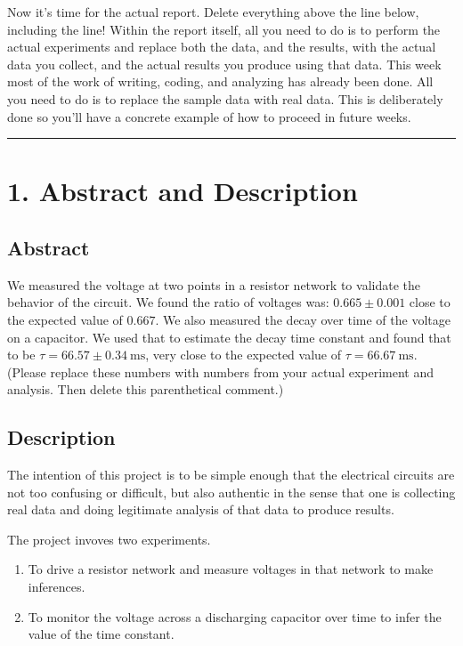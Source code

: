 \documentclass[
  letterpaper,
  DIV=11,
  numbers=noendperiod]{scrartcl}
\providecommand{\tightlist}{%
  \setlength{\itemsep}{0pt}\setlength{\parskip}{0pt}}\usepackage{longtable,booktabs,array}
\begin{document}
Now it's time for the actual report. Delete everything above the line
below, including the line! Within the report itself, all you need to do
is to perform the actual experiments and replace both the data, and the
results, with the actual data you collect, and the actual results you
produce using that data. This week most of the work of writing, coding,
and analyzing has already been done. All you need to do is to replace
the sample data with real data. This is deliberately done so you'll have
a concrete example of how to proceed in future weeks.

\begin{center}\rule{0.5\linewidth}{0.5pt}\end{center}

\section{1. Abstract and Description}\label{abstract-and-description}

\subsection{Abstract}\label{abstract}

We measured the voltage at two points in a resistor network to validate
the behavior of the circuit. We found the ratio of voltages was:
\(0.665\pm 0.001\) close to the expected value of \(0.667\). We also
measured the decay over time of the voltage on a capacitor. We used that
to estimate the decay time constant and found that to be
\(\tau = 66.57 \pm 0.34\mathrm{~ms}\), very close to the expected value
of \(\tau =66.67\mathrm{~ms}\). (Please replace these numbers with
numbers from your actual experiment and analysis. Then delete this
parenthetical comment.)

\subsection{Description}\label{description}

The intention of this project is to be simple enough that the electrical
circuits are not too confusing or difficult, but also authentic in the
sense that one is collecting real data and doing legitimate analysis of
that data to produce results.

The project invoves two experiments.

\begin{enumerate}
\def\labelenumi{\arabic{enumi}.}
\tightlist
\item
  To drive a resistor network and measure voltages in that network to
  make inferences.
\item
  To monitor the voltage across a discharging capacitor over time to
  infer the value of the time constant.
\end{enumerate}
\end{document}

